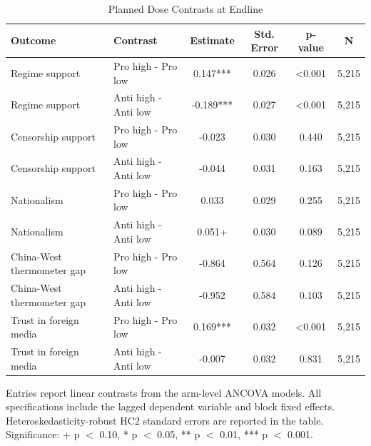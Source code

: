 \begin{table}[H]
\centering
\caption{Planned Dose Contrasts at Endline}
\label{tab:planned_contrasts_t1}
\footnotesize
\begin{threeparttable}
\begin{tabular}{llcccc}
\toprule
Outcome & Contrast & Estimate & Std. Error & p-value & N \\
\midrule
Regime support & Pro high - Pro low & 0.147*** & 0.026 & <0.001 & 5,215 \\
Regime support & Anti high - Anti low & -0.189*** & 0.027 & <0.001 & 5,215 \\
Censorship support & Pro high - Pro low & -0.023 & 0.030 & 0.440 & 5,215 \\
Censorship support & Anti high - Anti low & -0.044 & 0.031 & 0.163 & 5,215 \\
Nationalism & Pro high - Pro low & 0.033 & 0.029 & 0.255 & 5,215 \\
Nationalism & Anti high - Anti low & 0.051+ & 0.030 & 0.089 & 5,215 \\
China-West thermometer gap & Pro high - Pro low & -0.864 & 0.564 & 0.126 & 5,215 \\
China-West thermometer gap & Anti high - Anti low & -0.952 & 0.584 & 0.103 & 5,215 \\
Trust in foreign media & Pro high - Pro low & 0.169*** & 0.032 & <0.001 & 5,215 \\
Trust in foreign media & Anti high - Anti low & -0.007 & 0.032 & 0.831 & 5,215 \\
\bottomrule
\end{tabular}
\begin{tablenotes}[flushleft]
\footnotesize
\item Entries report linear contrasts from the arm-level ANCOVA models. All specifications include the lagged dependent variable and block fixed effects. Heteroskedasticity-robust HC2 standard errors are reported in the table. Significance: + p $<$ 0.10, * p $<$ 0.05, ** p $<$ 0.01, *** p $<$ 0.001.
\end{tablenotes}
\end{threeparttable}
\end{table}
